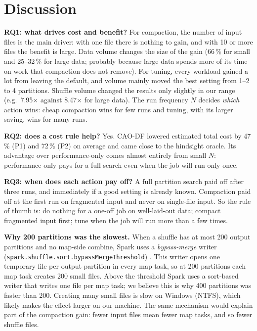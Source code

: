 \section{Discussion}
\label{sec:discussion}

\textbf{RQ1: what drives cost and benefit?} For compaction, the number of input files is the
main driver: with one file there is nothing to gain, and with 10 or more files the benefit is
large. Data volume changes the size of the gain (66\,\% for small and 25--32\,\% for large data;
probably because large data spends more of its time on work that compaction does not remove).
For tuning, every workload gained a lot from leaving the default, and volume mainly moved the
best setting from 1--2 to 4 partitions. Shuffle volume changed the results only slightly in
our range (e.g.\ 7.95$\times$ against 8.47$\times$ for large data). The run frequency $N$
decides \emph{which} action wins: cheap compaction wins for few runs and tuning, with its
larger saving, wins for many runs.

\textbf{RQ2: does a cost rule help?} Yes. CAO-DF lowered estimated total cost by 47\,\% (P1)
and 72\,\% (P2) on average and came close to the hindsight oracle. Its advantage over
performance-only comes almost entirely from small $N$: performance-only pays for a full search
even when the job will run only once.

\textbf{RQ3: when does each action pay off?} A full partition search paid off after three
runs, and immediately if a good setting is already known. Compaction paid off at the first run
on fragmented input and never on single-file input. So the rule of thumb is: do nothing for a
one-off job on well-laid-out data; compact fragmented input first; tune when the job will run
more than a few times.

\textbf{Why 200 partitions was the slowest.} When a shuffle has at most 200 output partitions
and no map-side combine, Spark uses a \emph{bypass-merge} writer
(\texttt{spark.shuffle.sort.bypassMergeThreshold}) \cite{spark2024config}. This writer opens one
temporary file per output partition in every map task, so at 200 partitions each map task
creates 200 small files. Above the threshold Spark uses a sort-based writer that writes one
file per map task; we believe this is why 400 partitions was faster than 200. Creating many
small files is slow on Windows (NTFS), which likely makes the effect larger on our machine. The
same mechanism would explain part of the compaction gain: fewer input files mean fewer map
tasks, and so fewer shuffle files.

